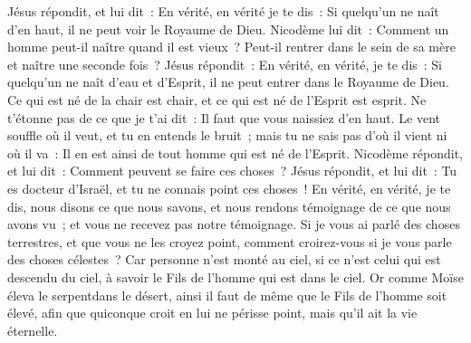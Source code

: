 \begin{multicols}{2}
Jésus répondit, et lui dit~: En vérité, en vérité je te dis~: Si quelqu'un ne naît d'en haut, il ne peut voir le Royaume de Dieu.
Nicodème lui dit~: Comment un homme peut-il naître quand il est vieux~? Peut-il rentrer dans le sein de sa mère et naître une seconde fois~?
Jésus répondit~: En vérité, en vérité, je te dis~: Si quelqu'un ne naît d'eau et d'Esprit, il ne peut entrer dans le Royaume de Dieu.
Ce qui est né de la chair est chair, et ce qui est né de l'Esprit est esprit.
Ne t'étonne pas de ce que je t'ai dit~: Il faut que vous naissiez d'en haut.
Le vent souffle où il veut, et tu en entends le bruit~; mais tu ne sais pas d'où il vient ni où il va~: Il en est ainsi de tout homme qui est né de l'Esprit.
Nicodème répondit, et lui dit~: Comment peuvent se faire ces choses~?
Jésus répondit, et lui dit~: Tu es docteur d'Israël, et tu ne connais point ces choses~!
En vérité, en vérité, je te dis, nous disons ce que nous savons, et nous rendons témoignage de ce que nous avons vu~; et vous ne recevez pas notre témoignage.
Si je vous ai parlé des choses terrestres, et que vous ne les croyez point, comment croirez-vous si je vous parle des choses célestes~?
Car personne n'est monté au ciel, si ce n'est celui qui est descendu du ciel, à savoir le Fils de l'homme qui est dans le ciel.
Or comme Moïse éleva le serpentdans le désert, ainsi il faut de même que le Fils de l'homme soit élevé,
afin que quiconque croit en lui ne périsse point, mais qu'il ait la vie éternelle.

\end{multicols}
